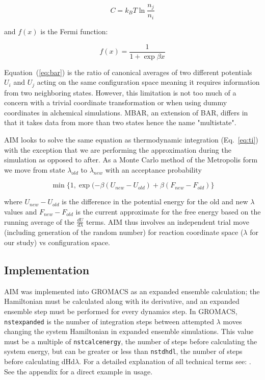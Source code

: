 \begin{equation}\label{eq:barc}
    C = k_{B}T\ln{\frac{n_{j}}{n_{i}}}
\end{equation} 

and $f(x)$ is the Fermi function:

\begin{equation}\label{eq:fermi}
    f(x) = \frac{1}{1 + \exp{\beta x}} 
\end{equation}

Equation\ (\ref{eq:bar}) is the ratio of canonical averages of two different potentials $U_{i}$ and $U_{j}$ acting on the same configuration space meaning it requires information from two neighboring states. However, this limitation is not too much of a concern with a trivial coordinate transformation or when using dummy coordinates in alchemical simulations. MBAR, an extension of BAR, differs in that it takes data from more than two states hence the name "multistate".

AIM looks to solve the same equation as thermodynamic integration (Eq.\ \ref{eq:ti}) with the exception that we are performing the approximation during the simulation as opposed to after. As a Monte Carlo method of the Metropolis form we move from state $\lambda_{old}$ to $\lambda_{new}$ with an acceptance probability

\begin{equation}\label{eq:aimaccept}
\min\{1,\exp(- \beta( U_{new} - U_{old})+\beta(F_{new} - F_{old})\}
\end{equation}

where $U_{new} - U_{old}$ is the difference in the potential energy for the old and new $\lambda$ values and $F_{new} - F_{old}$ is the current approximate for the free energy based on the running average of the $\frac{dU}{d\lambda}$ terms. AIM thus involves an independent trial move (including generation of the random number) for reaction coordinate space ($\lambda$ for our study) vs configuration space.

\subsection{Implementation}

AIM was implemented into GROMACS as an expanded ensemble calculation; the Hamiltonian must be calculated along with its derivative, and an expanded ensemble step must be performed for every dynamics step. In GROMACS, \texttt{nstexpanded} is the number of integration steps between attempted $\lambda$ moves changing the system Hamiltonian in expanded ensemble simulations. This value must be a multiple of \texttt{nstcalcenergy}, the number of steps before calculating the system energy, but can be greater or less than \texttt{nstdhdl}, the number of steps before calculating dHd$\lambda$. For a detailed explanation of all technical terms see: \cite{gmxmanual}. See the appendix for a direct example in usage.

